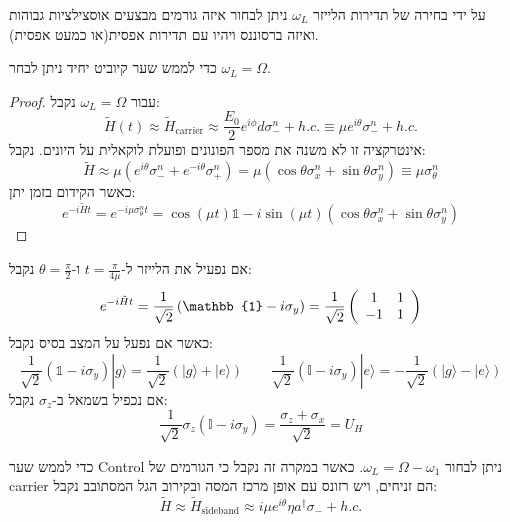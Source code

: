 \documentclass{tstextbook}
\begin{document}
\begin{corollary}
על ידי בחירה של תדירות הלייזר \(\omega_{L}\) ניתן לבחור איזה גורמים מבצעים אוסצילציות גבוהות ואיזה ברסוננס ויהיו עם תדירות אפסית(או כמעט אפסית).

\end{corollary}
\begin{proposition}
כדי לממש שער קיוביט יחיד ניתן לבחר \(\omega_{L}=\Omega\).

\end{proposition}
\begin{proof}
עבור \(\omega_{L}=\Omega\) נקבל:
$$\tilde{H}\left(t\right)\approx\tilde{H}_{\mathrm{carrier}}\approx\frac{E_{0}}{2}e^{i\phi}d\sigma_{-}^{n}+h.c.\equiv\mu e^{i\theta}\sigma_{-}^{n}+h.c.$$
אינטרקציה זו לא משנה את מספר הפונונים ופועלת לוקאלית על היונים. נקבל:
$$\widetilde{H}\approx\mu\left(e^{i\theta}\sigma_{-}^{n}+e^{-i\theta}\sigma_{+}^{n}\right)=\mu\left(\cos\theta\sigma_{x}^{n}+\sin\theta\sigma_{y}^{n}\right)\equiv\mu\sigma_{\theta}^{n}$$
כאשר הקידום בזמן יתן:
$$e^{-i\tilde{H}t}=e^{-i\mu\sigma_{\theta}^{n}t}=\cos\left(\mu t\right)\mathbb{1}-i\sin\left(\mu t\right)\left(\cos\theta\sigma_{x}^{n}+\sin\theta\sigma_{y}^{n}\right)$$

\end{proof}
\begin{example}
אם נפעיל את הלייזר ל-\(t=\frac{\pi}{4\mu}\) ו-\(\theta=\frac{\pi}{2}\) נקבל:
$$e^{-i\tilde{H}t}=\frac{1}{\sqrt{2}}\left(\mathbb{1}-i\sigma_{y}\right)=\frac{1}{\sqrt{2}}\left(\begin{array}{c c}{{1}}&{{1}}\\ {{-1}}&{{1}}\end{array}\right)$$
כאשר אם נפעל על המצב בסיס נקבל:
$$\frac{1}{\sqrt{2}}\left(\mathbb{1}-i\sigma_{y}\right)|g\rangle=\frac{1}{\sqrt{2}}\left(|g\rangle+|e\rangle\right)\qquad \frac{1}{\sqrt{2}}\left(\mathbb{I}-i\sigma_{y}\right)|e\rangle=-\frac{1}{\sqrt{2}}\left(|g\rangle-|e\rangle\right)$$
אם נכפיל בשמאל ב-\(\sigma_{z}\) נקבל:
$$\frac{1}{\sqrt{2}}\sigma_{z}\left(\mathbb{I}-i\sigma_{y}\right)=\frac{\sigma_{z}+\sigma_{x}}{\sqrt{2}}=U_{H}$$

\end{example}
\begin{proposition}
כדי לממש שער Control ניתן לבחור \(\omega_{L}=\Omega-\omega_{1}\). כאשר במקרה זה נקבל כי הגורמים של carrier הם זניחים, ויש רזונס עם אופן מרכז המסה ובקירוב הגל המסתובב נקבל:
$$\tilde{H}\approx\tilde{H}_{\mathrm{sideband}}\approx i\mu e^{i\theta}\eta a^{\dagger}\sigma_{-}+h.c.$$

\end{proposition}
\end{document}
